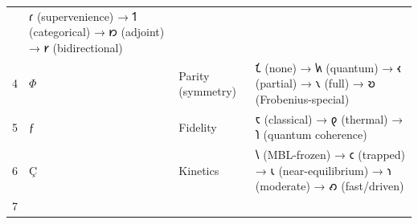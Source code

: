 \documentclass[12pt,a4paper]{article}
\begin{document}
\begin{longtable}[]{@{}llll@{}}
\begin{minipage}[t]{0.13\columnwidth}
\end{minipage} & \begin{minipage}[t]{0.44\columnwidth}\raggedright
𐑩 (supervenience) → 𐑑 (categorical) → 𐑽 (adjoint) → 𐑾
(bidirectional)\strut
\end{minipage}\tabularnewline
\begin{minipage}[t]{0.07\columnwidth}\raggedright
4\strut
\end{minipage} & \begin{minipage}[t]{0.24\columnwidth}\raggedright
\(Φ\)\strut
\end{minipage} & \begin{minipage}[t]{0.13\columnwidth}\raggedright
Parity (symmetry)\strut
\end{minipage} & \begin{minipage}[t]{0.44\columnwidth}\raggedright
𐑗 (none) → 𐑿 (quantum) → 𐑬 (partial) → 𐑯 (full) → 𐑹
(Frobenius-special)\strut
\end{minipage}\tabularnewline
\begin{minipage}[t]{0.07\columnwidth}\raggedright
5\strut
\end{minipage} & \begin{minipage}[t]{0.24\columnwidth}\raggedright
\(ƒ\)\strut
\end{minipage} & \begin{minipage}[t]{0.13\columnwidth}\raggedright
Fidelity\strut
\end{minipage} & \begin{minipage}[t]{0.44\columnwidth}\raggedright
𐑱 (classical) → 𐑞 (thermal) → 𐑐 (quantum coherence)\strut
\end{minipage}\tabularnewline
\begin{minipage}[t]{0.07\columnwidth}\raggedright
6\strut
\end{minipage} & \begin{minipage}[t]{0.24\columnwidth}\raggedright
\(Ç\)\strut
\end{minipage} & \begin{minipage}[t]{0.13\columnwidth}\raggedright
Kinetics\strut
\end{minipage} & \begin{minipage}[t]{0.44\columnwidth}\raggedright
𐑘 (MBL-frozen) → 𐑤 (trapped) → 𐑧 (near-equilibrium) → 𐑪 (moderate) → 𐑺
(fast/driven)\strut
\end{minipage}\tabularnewline
\begin{minipage}[t]{0.07\columnwidth}\raggedright
7\strut
\end{minipage} & \begin{minipage}[t]{0.24\columnwidth}\raggedright

\end{minipage}
\end{longtable}
\end{document}

